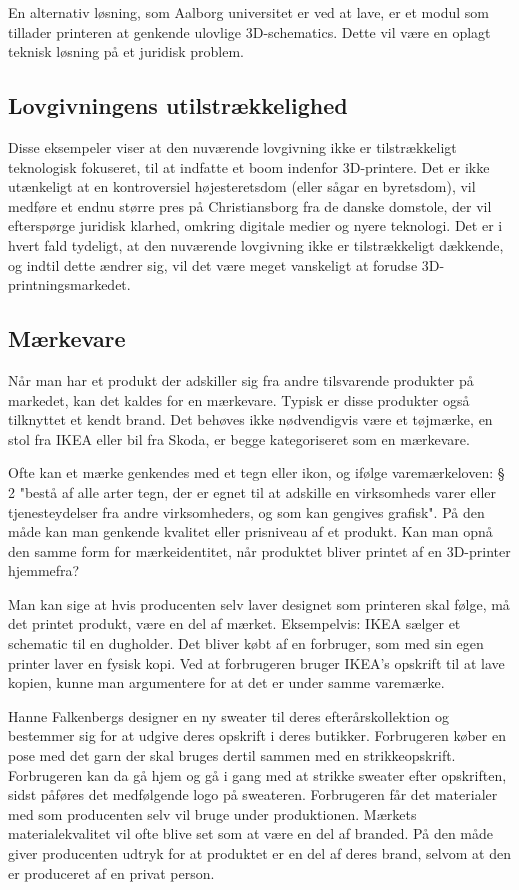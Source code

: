 En alternativ løsning, som Aalborg universitet er ved at lave, er et modul som tillader printeren at genkende ulovlige 3D-schematics. Dette vil være en oplagt teknisk løsning på et juridisk problem.

\subsection{Lovgivningens utilstrækkelighed}
 
Disse eksempeler viser at den nuværende lovgivning ikke er tilstrækkeligt teknologisk fokuseret, til at indfatte et boom indenfor 3D-printere. Det er ikke utænkeligt at en kontroversiel højesteretsdom (eller sågar en byretsdom), vil medføre et endnu større pres på Christiansborg fra de danske domstole, der vil efterspørge juridisk klarhed, omkring digitale medier og nyere teknologi.
Det er i hvert fald tydeligt, at den nuværende lovgivning ikke er tilstrækkeligt dækkende, og indtil dette ændrer sig, vil det være meget vanskeligt at forudse 3D-printningsmarkedet.

\subsection{Mærkevare}

Når man har et produkt der adskiller sig fra andre tilsvarende produkter på markedet, kan det kaldes for en mærkevare. Typisk er disse produkter også tilknyttet et kendt brand.
Det behøves ikke nødvendigvis være et tøjmærke, en stol fra IKEA eller bil fra Skoda, er begge kategoriseret som en mærkevare. 

Ofte kan et mærke genkendes med et tegn eller ikon, og ifølge varemærkeloven: § 2 "bestå af alle arter tegn, der er egnet til at adskille en virksomheds varer eller tjenesteydelser fra andre virksomheders, og som kan gengives grafisk". På den måde kan man genkende kvalitet eller prisniveau af et produkt. 
Kan man opnå den samme form for mærkeidentitet, når produktet bliver printet af en 3D-printer hjemmefra?

Man kan sige at hvis producenten selv laver designet som printeren skal følge, må det printet produkt, være en del af mærket. Eksempelvis: IKEA sælger et schematic til en dugholder. Det bliver købt af en forbruger, som med sin egen printer laver en fysisk kopi. Ved at forbrugeren bruger IKEA’s opskrift til at lave kopien, kunne man argumentere for at det er under samme varemærke. 

Hanne Falkenbergs\autocite{hanne_falkenberg_hanne_????} designer en ny sweater til deres efterårskollektion og bestemmer sig for at udgive deres opskrift i deres butikker. Forbrugeren køber en pose med det garn der skal bruges dertil sammen med en strikkeopskrift. Forbrugeren kan da gå hjem og gå i gang med at strikke sweater efter opskriften, sidst påføres det medfølgende logo på sweateren. Forbrugeren får det materialer med som producenten selv vil bruge under produktionen. Mærkets materialekvalitet vil ofte blive set som at være en del af branded.  På den måde giver producenten udtryk for at produktet er en del af deres brand, selvom at den er produceret af en privat person. 
																
